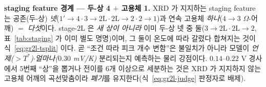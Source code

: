\begin{keybox}
\textbf{staging feature 경계 --- 두-상 4 $+$ 고용체 1.} XRD\cite{dahn1991} 가 지지하는 staging feature 는
공존(두-상) \emph{넷}($1'\!\to\!4\cdot3\!\to\!2\mathrm L\cdot2\mathrm L\!\to\!2\cdot2\!\to\!1$)과 연속 고용체
\emph{하나}($4\!\to\!3$ $\Omega$-어깨) $=$ \emph{다섯}이다. stage-2L 은 \emph{새 상이 아니라} 이미 두-상 넷 중
둘($3\!\to\!2\mathrm L\cdot2\mathrm L\!\to\!2$, 표~\ref{tab:staging} 가 이미 별도 명명)이며, 그 둘이 온도에 따라
갈렸다 합쳐지는 것이 식~\eqref{eq:gr2l-tsplit} 이다. 곧 ``조건 따라 피크 개수 변함''은 불일치가 아니라 모델이
\emph{언제($>\!T^\ast$)$\cdot$얼마나($0.30$ mV/K)} 분리되는지 예측하는 물리 강점이다. $0.14$--$0.22$ V 경사에서
$5$번째 ``상''을 뽑거나 전이를 $6$개 이상으로 세분하는 것은 XRD 가 지지하지 않는 고용체 어깨의 곡선맞춤이라
\emph{폐기}를 유지한다(식~\eqref{eq:gr2l-judge} 판정자로 배제).
\end{keybox}

